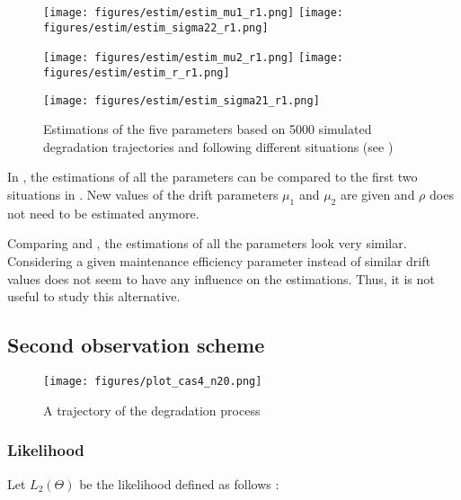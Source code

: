 \begin{figure}[h!]
\centering
\begin{multicols}{3}
\texttt{[image: figures/estim/estim\_mu1\_r1.png]} 
\texttt{[image: figures/estim/estim\_sigma22\_r1.png]} \\
\columnbreak

\texttt{[image: figures/estim/estim\_mu2\_r1.png]} 
\texttt{[image: figures/estim/estim\_r\_r1.png]} \\
\columnbreak

\texttt{[image: figures/estim/estim\_sigma21\_r1.png]} \\


\end{multicols}
\caption{Estimations of the five parameters based on 5000 simulated degradation trajectories and following different situations (see )}
\label{estim_para_rho1}
\end{figure}


\noindent In , the estimations of all the parameters can be compared to the first two situations in . New values of the drift parameters $\mu_1$ and $\mu_2$ are given and $\rho$ does not need to be estimated anymore.

\noindent Comparing   and , the estimations of all the parameters look very similar. Considering a given maintenance efficiency parameter instead of similar drift values does not seem to have any influence on the estimations. Thus, it is not useful to study this alternative.

\clearpage

\subsection{Second observation scheme}

\begin{figure}[h!]
\centering
\texttt{[image: figures/plot\_cas4\_n20.png]} 
\caption{A trajectory of the degradation process }
\end{figure}

\subsubsection{Likelihood}

Let $L_2(\Theta)$ be the likelihood defined as follows :\\

